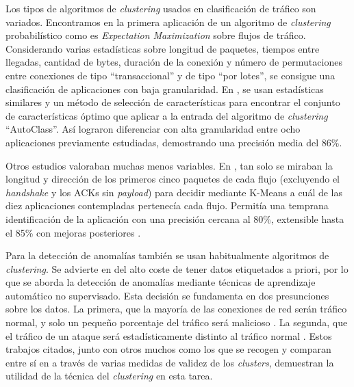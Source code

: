 Los tipos de algoritmos de \emph{clustering} usados en clasificación de tráfico son variados.
Encontramos en \cite{MHL+04} la primera aplicación de un algoritmo de \emph{clustering} probabilístico como es \emph{Expectation Maximization} sobre flujos de tráfico.
Considerando varias estadísticas sobre longitud de paquetes, tiempos entre llegadas, cantidad de bytes, duración de la conexión y
número de permutaciones entre conexiones de tipo ``transaccional'' y de tipo ``por lotes'', se consigue una clasificación de aplicaciones con baja granularidad.
En \cite{ZNA05}, se usan estadísticas similares y un método de selección de características para encontrar el conjunto de características óptimo
que aplicar a la entrada del algoritmo de \emph{clustering} ``AutoClass''.
Así lograron diferenciar con alta granularidad entre ocho aplicaciones previamente estudiadas, demostrando una precisión media del 86\%.

Otros estudios valoraban muchas menos variables.
En \cite{BTA+06}, tan solo se miraban la longitud y dirección de los primeros cinco paquetes de cada flujo (excluyendo el \emph{handshake} y los ACKs sin \emph{payload})
para decidir mediante K-Means a cuál de las diez aplicaciones contempladas pertenecía cada flujo.
Permitía una temprana identificación de la aplicación con una precisión cercana al 80\%, extensible hasta el 85\% con mejoras posteriores \cite{BTS06} \cite{BT07}.

Para la detección de anomalías también se usan habitualmente algoritmos de \emph{clustering}.
Se advierte en \cite{Leung_2005} del alto coste de tener datos etiquetados a priori,
por lo que se aborda la detección de anomalías mediante técnicas de aprendizaje automático no supervisado.
Esta decisión se fundamenta en dos presunciones sobre los datos.
La primera, que la mayoría de las conexiones de red serán tráfico normal, y solo un pequeño porcentaje del tráfico será malicioso \cite{Portnoy_2000}.
La segunda, que el tráfico de un ataque será estadísticamente distinto al tráfico normal \cite{Javitz_1993}.
Estos trabajos citados, junto con otros muchos como los que se recogen y comparan entre sí en \cite{Bhuyan_2014} a través de varias medidas de validez de los \emph{clusters},
demuestran la utilidad de la técnica del \emph{clustering} en esta tarea.

